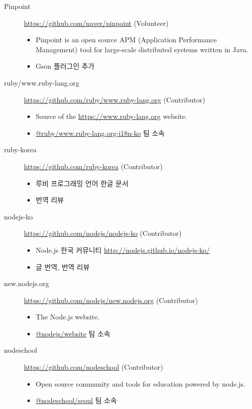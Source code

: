 \documentclass[a4paper,10pt]{article}
\begin{document}
\begin{description}
  \item[Pinpoint] \url{https://github.com/naver/pinpoint} (Volunteer)
    \begin{itemize}
      \item Pinpoint is an open source APM (Application Performance Management) tool for large-scale distributed systems written in Java.
      \item Gson 플러그인 추가
    \end{itemize}
  \item[ruby/www.ruby-lang.org] \url{https://github.com/ruby/www.ruby-lang.org} (Contributor)
    \begin{itemize}
      \item Source of the \url{https://www.ruby-lang.org} website.
      \item \href{https://github.com/orgs/ruby/teams/www-ruby-lang-org-i18n-ko}{@ruby/www.ruby-lang.org-i18n-ko} 팀 소속
    \end{itemize}
  \item[ruby-korea] \url{https://github.com/ruby-korea} (Contributor)
    \begin{itemize}
      \item 루비 프로그래밍 언어 한글 문서
      \item 번역 리뷰
    \end{itemize}
  \item[nodejs-ko] \url{https://github.com/nodejs/nodejs-ko} (Contributor)
    \begin{itemize}
      \item Node.js 한국 커뮤니티 \url{http://nodejs.github.io/nodejs-ko/}
      \item 글 번역, 번역 리뷰
    \end{itemize}
  \item[new.nodejs.org] \url{https://github.com/nodejs/new.nodejs.org} (Contributor)
    \begin{itemize}
      \item The Node.js website.
      \item \href{https://github.com/orgs/nodejs/teams/website}{@nodejs/website} 팀 소속
    \end{itemize}
  \item[nodeschool] \url{https://github.com/nodeschool} (Contributor)
    \begin{itemize}
      \item Open source community and tools for education powered by node.js.
      \item \href{https://github.com/orgs/nodeschool/teams/seoul}{@nodeschool/seoul} 팀 소속

\end{itemize}
\end{description}
\end{document}
